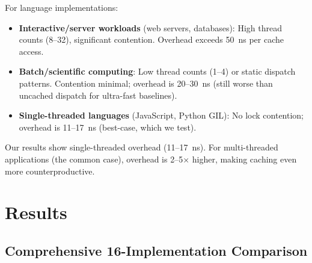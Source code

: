 \documentclass[sigplan,final]{acmart}
\begin{document}
For language implementations:

\begin{itemize}
  \item \textbf{Interactive/server workloads} (web servers, databases): High thread counts (8--32),
    significant contention. Overhead exceeds 50~ns per cache access.

  \item \textbf{Batch/scientific computing}: Low thread counts (1--4) or static dispatch patterns.
    Contention minimal; overhead is 20--30~ns (still worse than uncached dispatch for ultra-fast baselines).

  \item \textbf{Single-threaded languages} (JavaScript, Python GIL): No lock contention; overhead
    is 11--17~ns (best-case, which we test).
\end{itemize}

Our results show single-threaded overhead (11--17~ns). For multi-threaded applications (the
common case), overhead is 2--5× higher, making caching even more counterproductive.

\section{Results}

\subsection{Comprehensive 16-Implementation Comparison}
\end{document}
